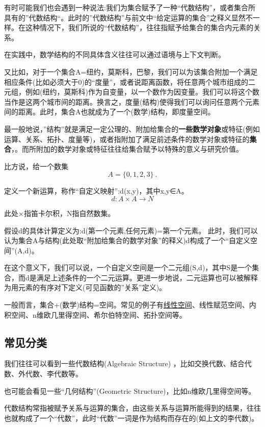 有时可能我们也会遇到一种说法:我们为集合赋予了一种“代数结构”，或者集合所具有的”代数结构“。此时的”代数结构”与前文中“给定运算的集合”之释义显然不一样。在这种情况下，我们所说的“代数结构”，往往指赋予给集合的集合内元素的关系。

在实践中，数学结构的不同具体含义往往可以通过语境与上下文判断。

又比如，对于一个集合A={纽约，莫斯科，巴黎}，我们可以为该集合附加一个满足相应条件(比如必须大于0)的“度量”，或者说距离函数，将任意两个城市组成的二元组，例如(纽约，莫斯科)作为自变量，以一个数作为因变量。我们可以将这个数当作是这两个城市间的距离。换言之，度量(结构)使得我们可以询问任意两个元素间的距离。此时，集合A也就成为了一个(数学)结构，即度量空间。

最一般地说，”结构”就是满足一定公理的、附加给集合的\textbf{一些数学对象}或特征(例如运算、关系、拓扑、度量等)，或者指附加了满足前述条件的数学对象或特征的\textbf{集合}，。而所附加的数学对象或特征往往给集合赋予以特殊的意义与研究价值。

比方说，给一个数集
\begin{equation}
A = \{ 0,1,2,3 \}~.
\end{equation}

定义一个新运算，称作“自定义映射”:d(x,y)，其中x,y∈A。
\begin{equation}
d:A \times A  \to N
\end{equation}

此处×指笛卡尔积，N指自然数集。

假设d的具体计算定义为:d(第一个元素,任何元素)=第一个元素。
此时，我们可以认为集合A与结构(此处取“附加给集合的数学对象”的释义)d构成了一个“自定义空间”(A,d)。

在这个意义下，我们可以说，一个自定义空间是一个二元组(S,d)，其中S是一个集合，而d是满足上述条件的一个二元运算。更进一步地说，二元运算也可以被解释为用元素的有序对下定义(可见函数的”关系”定义)。

一般而言，集合+(数学)结构=空间。常见的例子有\href{https://wuli.wiki/online/LSpace.html}{线性空间}、线性赋范空间、内积空间、n维欧几里得空间、希尔伯特空间、拓扑空间等。

\subsection{常见分类}
我们往往可以看到一些代数结构(Algebraic Structure) ，比如交换代数、结合代数、外代数、李代数等。

也可能会看见一些“几何结构”(Geometric Structure)，比如n维欧几里得空间等。

代数结构常指被赋予关系与运算的集合，由这些关系与运算所能得到的结果，往往也就构成了一个“代数”，此时“代数”一词是作为结构而存在的(如上文的李代数)。


